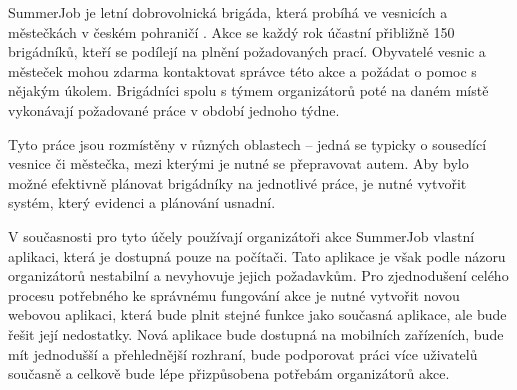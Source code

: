 \begin{introduction}
SummerJob je letní dobrovolnická brigáda, která probíhá
ve vesnicích a městečkách v českém pohraničí \cite{summerjob}. Akce se každý rok účastní přibližně 150 brigádníků, kteří se podílejí na plnění požadovaných prací.
Obyvatelé vesnic a městeček mohou zdarma kontaktovat správce této akce a požádat o pomoc s nějakým úkolem.
Brigádníci spolu s týmem organizátorů poté na daném místě vykonávají požadované práce v období jednoho týdne.

Tyto práce jsou rozmístěny v různých oblastech -- jedná se typicky o sousedící vesnice či městečka, mezi kterými je nutné se přepravovat autem.
Aby bylo možné efektivně plánovat brigádníky na jednotlivé práce, je nutné vytvořit systém, který evidenci a plánování usnadní.

V současnosti pro tyto účely používají organizátoři akce SummerJob vlastní aplikaci, která je dostupná pouze na počítači. Tato aplikace je však podle
názoru organizátorů nestabilní a nevyhovuje jejich požadavkům. Pro zjednodušení celého procesu potřebného ke správnému fungování akce je nutné vytvořit novou webovou aplikaci,
která bude plnit stejné funkce jako
současná aplikace, ale bude řešit její nedostatky. Nová aplikace bude dostupná na mobilních zařízeních, bude mít jednodušší a přehlednější rozhraní, bude
podporovat práci více uživatelů současně a celkově bude lépe přizpůsobena potřebám organizátorů akce.
\end{introduction}